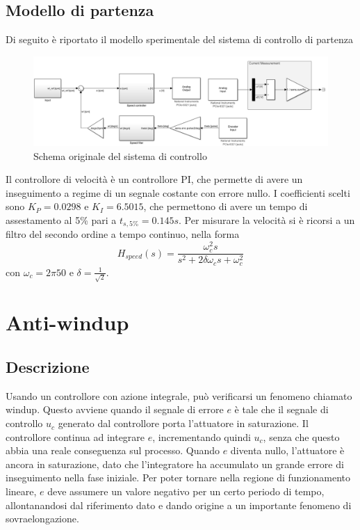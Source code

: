 \documentclass[a4paper, 11pt, Arial]{article}
\begin{document}
\subsection{Modello di partenza}
Di seguito è riportato il modello sperimentale del sistema di controllo di partenza
\begin{figure}[H]
    \centering
    \includegraphics[width=\linewidth]{Images/original.png}
    \caption{Schema originale del sistema di controllo}
    \label{sim:initial}
\end{figure}
Il controllore di velocità è un controllore PI, che permette di avere un inseguimento a regime di un segnale costante con errore nullo. I coefficienti scelti sono $K_{P} = 0.0298$ e $K_{I} = 6.5015$, che permettono di avere un tempo di assestamento al 5\% pari a $t_{s, 5\%} = 0.145s$. Per misurare la velocità si è ricorsi a un filtro del secondo ordine a tempo continuo, nella forma
\begin{equation}
    H_{speed}(s) = \frac{\omega_{c}^2 s}{s^2 + 2 \delta \omega_{c} s + \omega_{c}^2}
    \label{sim:speed_filter}
\end{equation}
con $\omega_{c} = 2 \pi 50$ e $\delta = \frac{1}{\sqrt{2}}$.

\section{Anti-windup}

\subsection{Descrizione}
Usando un controllore con azione integrale, può verificarsi un fenomeno chiamato windup. Questo avviene quando il segnale di errore $e$ è tale che il segnale di controllo $u_{c}$ generato dal controllore porta l'attuatore in saturazione. Il controllore continua ad integrare $e$, incrementando quindi $u_{c}$, senza che questo abbia una reale conseguenza sul processo. Quando $e$ diventa nullo, l'attuatore è ancora in saturazione, dato che l'integratore ha accumulato un grande errore di inseguimento nella fase iniziale. Per poter tornare nella regione di funzionamento lineare, $e$ deve assumere un valore negativo per un certo periodo di tempo, allontanandosi dal riferimento dato e dando origine a un importante fenomeno di sovraelongazione.
\end{document}
